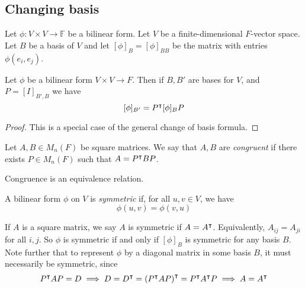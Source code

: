 \subsection{Changing basis}
Let \( \phi \colon V \times V \to \mathbb F \) be a bilinear form.
Let \( V \) be a finite-dimensional \( F \)-vector space.
Let \( B \) be a basis of \( V \) and let \( [\phi]_B = [\phi]_{BB} \) be the matrix with entries \( \phi(e_i, e_j) \).
\begin{lemma}
	Let \( \phi \) be a bilinear form \( V \times V \to F \).
	Then if \( B, B' \) are bases for \( V \), and \( P = [I]_{B', B} \) we have
	\[
		[\phi]_{B'} = P^\intercal [\phi]_B P
	\]
\end{lemma}
\begin{proof}
	This is a special case of the general change of basis formula.
\end{proof}
\begin{definition}
	Let \( A, B \in M_n(F) \) be square matrices.
	We say that \( A, B \) are \textit{congruent} if there exists \( P \in M_n(F) \) such that \( A = P^\intercal B P \).
\end{definition}
\begin{remark}
	Congruence is an equivalence relation.
\end{remark}
\begin{definition}
	A bilinear form \( \phi \) on \( V \) is \textit{symmetric} if, for all \( u, v \in V \), we have
	\[
		\phi(u,v) = \phi(v,u)
	\]
\end{definition}
\begin{remark}
	If \( A \) is a square matrix, we say \( A \) is symmetric if \( A = A^\intercal \).
	Equivalently, \( A_{ij} = A_{ji} \) for all \( i, j \).
	So \( \phi \) is symmetric if and only if \( [\phi]_B \) is symmetric for any basis \( B \).
	Note further that to represent \( \phi \) by a diagonal matrix in some basis \( B \), it must necessarily be symmetric, since
	\[
		P^\intercal A P = D \implies D = D^\intercal = \qty(P^\intercal A P)^\intercal = P^\intercal A^\intercal P \implies A = A^\intercal
	\]
\end{remark}

